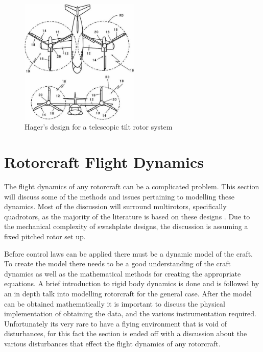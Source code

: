 \begin{figure}[H]
\centering
\includegraphics[height = 6cm]{Images/Literature/TiltRotor}     
\caption{Hager's design for a telescopic tilt rotor system \cite{Heli}}
\label{IM_TiltRotor}
\end{figure}


\section{Rotorcraft Flight Dynamics}

The flight dynamics of any rotorcraft can be  a complicated problem. This section will discuss some of the methods and issues pertaining to modelling these dynamics. Most of the discussion will surround multirotors, specifically quadrotors, as the majority of the literature is based on these designs \cite{Luukkonen, RealTime, Pounds2006, Hoffmann}. Due to the mechanical complexity of swashplate designs, the discussion is assuming a fixed pitched rotor set up. 

Before control laws can be applied there must be a dynamic model of the craft. To create the model there needs to be a good understanding of the craft dynamics as well as the mathematical methods for creating the appropriate equations. A brief introduction to rigid body dynamics is done and is followed by an in depth talk into modelling rotorcraft for the general case. After the model can be obtained mathematically it is important to discuss the physical implementation of obtaining the data, and the various instrumentation required. Unfortunately its very rare to have a flying environment that is void of disturbances, for this fact the section is ended off with a discussion about the various disturbances that effect the flight dynamics of any rotorcraft.

